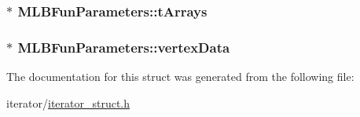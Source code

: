 \label{structMLBFunParameters_ae30f1ae18cf7dc38b28d8dcacfe57eff}
\hypertarget{structMLBFunParameters_ae7e20a4db032dafb9a56836cfb3a4ea8}{
\subsubsection[{tArrays}]{$\ast$ {\bf MLBFunParameters::tArrays}}}
\label{structMLBFunParameters_ae7e20a4db032dafb9a56836cfb3a4ea8}
\hypertarget{structMLBFunParameters_ac10ea14c3141f3e566dee0568f1f4b2f}{
\subsubsection[{vertexData}]{$\ast$ {\bf MLBFunParameters::vertexData}}}
\label{structMLBFunParameters_ac10ea14c3141f3e566dee0568f1f4b2f}


The documentation for this struct was generated from the following file:\begin{DoxyCompactItemize}
\item 
iterator/\hyperlink{iterator__struct_8h}{iterator\_\-struct.h}\end{DoxyCompactItemize}

